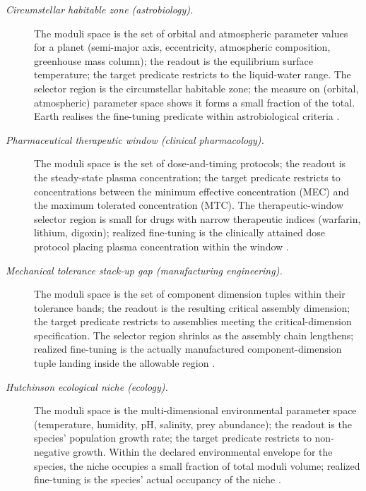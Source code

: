 \documentclass[11pt]{article}
\theoremstyle{definition}
\begin{document}
\begin{description}
\item[\emph{Circumstellar habitable zone (astrobiology).}]
The moduli space is the set of orbital and
atmospheric parameter values for a planet (semi-major
axis, eccentricity, atmospheric composition, greenhouse
mass column); the readout is the equilibrium surface
temperature; the target predicate restricts to the
liquid-water range.  The selector region is the
circumstellar habitable zone; the measure on
(orbital, atmospheric) parameter space shows it forms
a small fraction of the total.  Earth realises the
fine-tuning predicate within astrobiological criteria
\citep{Kasting1993Habitable}.

\item[\emph{Pharmaceutical therapeutic window
(clinical pharmacology).}]
The moduli space is the set of dose-and-timing
protocols; the readout is the steady-state plasma
concentration; the target predicate restricts to
concentrations between the minimum effective
concentration (MEC) and the maximum tolerated
concentration (MTC).  The therapeutic-window selector
region is small for drugs with narrow therapeutic
indices (warfarin, lithium, digoxin); realized
fine-tuning is the clinically attained dose protocol
placing plasma concentration within the window
\citep{GoodmanGilman2018Pharmacology}.

\item[\emph{Mechanical tolerance stack-up gap
(manufacturing engineering).}]
The moduli space is the set of component dimension
tuples within their tolerance bands; the readout is
the resulting critical assembly dimension; the
target predicate restricts to assemblies meeting the
critical-dimension specification.  The selector
region shrinks as the assembly chain lengthens;
realized fine-tuning is the actually manufactured
component-dimension tuple landing inside the
allowable region \citep{Bjorke1989Tolerance}.

\item[\emph{Hutchinson ecological niche (ecology).}]
The moduli space is the multi-dimensional
environmental parameter space (temperature,
humidity, pH, salinity, prey abundance); the readout
is the species' population growth rate; the target
predicate restricts to non-negative growth.  Within
the declared environmental envelope for the species,
the niche occupies a small fraction of total moduli
volume; realized fine-tuning is the species' actual
occupancy of the niche
\citep{Hutchinson1957Concluding}.


\end{description}
\end{document}
